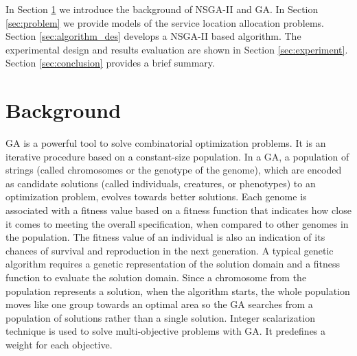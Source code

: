 \documentclass{llncs}
\begin{document}
In Section \ref{sec:Background} we introduce the background of NSGA-II and GA.
In Section \ref{sec:problem} we provide models of the service location allocation problems. Section \ref{sec:algorithm_des} develops a NSGA-II based algorithm. 
The experimental design and results evaluation are shown in Section \ref{sec:experiment}. Section \ref{sec:conclusion} provides a brief summary.


\section{Background}
\label{sec:Background}
GA \cite{man1996genetic} is a powerful tool to solve combinatorial optimization problems. It is an iterative procedure based on a constant-size population. In a GA, a population of strings (called chromosomes
or the genotype of the genome), which are encoded as candidate solutions (called individuals, creatures, or phenotypes) to an optimization problem, evolves towards better solutions. 
Each genome is associated with a fitness value based on a fitness function that indicates how close it comes to meeting the overall specification, when compared to other genomes in the
population. The fitness value of an individual is also an indication of its chances of survival and reproduction in the next generation. A typical genetic algorithm requires a genetic
representation of the solution domain and a fitness function to evaluate the solution domain. Since a chromosome from the population represents a solution, when the algorithm starts, 
the whole population moves like one group towards an optimal area so the GA searches from a population of solutions rather than a single solution. Integer scalarization technique \cite{Multiobjective} is 
used to solve multi-objective problems with GA. It predefines a weight for each objective.
\end{document}
